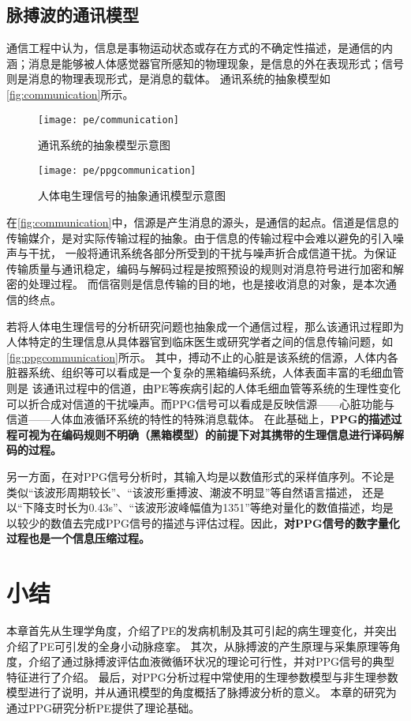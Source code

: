 \subsection{脉搏波的通讯模型}
通信工程中认为，信息是事物运动状态或存在方式的不确定性描述，是通信的内涵；消息是能够被人体感觉器官所感知的物理现象，是信息的外在表现形式；信号则是消息的物理表现形式，是消息的载体\cite{Shannon1948,Liu2019,Zhao2017}。
通讯系统的抽象模型如\autoref{fig:communication}所示。

\begin{figure}[htbp]
    \centering
    \texttt{[image: pe/communication]}
    \caption[通讯系统的抽象模型示意图]{\label{fig:communication}通讯系统的抽象模型示意图\cite{Zhao2017,Liu2019}}
\end{figure}

\begin{figure}[ht]
    \centering
    \texttt{[image: pe/ppgcommunication]}
    \caption{\label{fig:ppgcommunication}人体电生理信号的抽象通讯模型示意图}
\end{figure}

在\autoref{fig:communication}中，信源是产生消息的源头，是通信的起点。信道是信息的传输媒介，是对实际传输过程的抽象。由于信息的传输过程中会难以避免的引入噪声与干扰，
一般将通讯系统各部分所受到的干扰与噪声折合成信道干扰。为保证传输质量与通讯稳定，编码与解码过程是按照预设的规则对消息符号进行加密和解密的处理过程。
而信宿则是信息传输的目的地，也是接收消息的对象，是本次通信的终点\cite{Zhao2017}。

若将人体电生理信号的分析研究问题也抽象成一个通信过程，那么该通讯过程即为人体特定的生理信息从具体器官到临床医生或研究学者之间的信息传输问题，如\autoref{fig:ppgcommunication}所示。
其中，搏动不止的心脏是该系统的信源，人体内各脏器系统、组织等可以看成是一个复杂的黑箱编码系统，人体表面丰富的毛细血管则是
该通讯过程中的信道，由PE等疾病引起的人体毛细血管等系统的生理性变化可以折合成对信道的干扰噪声。而PPG信号可以看成是反映信源——心脏功能与信道——人体血液循环系统的特性的特殊消息载体。
在此基础上，\textbf{PPG的描述过程可视为在编码规则不明确（黑箱模型）的前提下对其携带的生理信息进行译码解码的过程。}

另一方面，在对PPG信号分析时，其输入均是以数值形式的采样值序列。不论是类似“该波形周期较长”、“该波形重搏波、潮波不明显”等自然语言描述，
还是以“下降支时长为0.43s”、“该波形波峰幅值为1351”等绝对量化的数值描述，均是以较少的数值去完成PPG信号的描述与评估过程。因此，\textbf{对PPG信号的数字量化过程也是一个信息压缩过程。}

\section{小结}
本章首先从生理学角度，介绍了PE的发病机制及其可引起的病生理变化，并突出介绍了PE可引发的全身小动脉痉挛。
其次，从脉搏波的产生原理与采集原理等角度，介绍了通过脉搏波评估血液微循环状况的理论可行性，并对PPG信号的典型特征进行了介绍。
最后，对PPG分析过程中常使用的生理参数模型与非生理参数模型进行了说明，并从通讯模型的角度概括了脉搏波分析的意义。
本章的研究为通过PPG研究分析PE提供了理论基础。